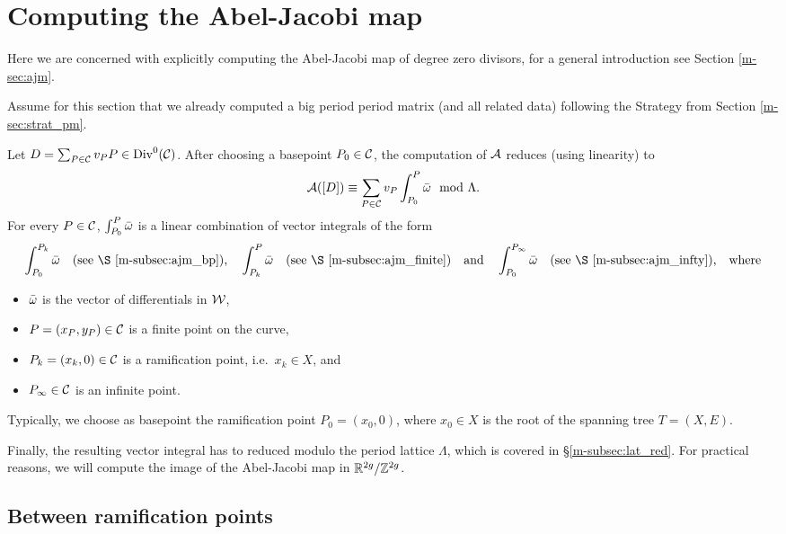 \documentclass[main.tex]{subfiles}
\begin{document}
  \section{Computing the Abel-Jacobi map}\label{sec:comp_ajm}
  
   Here we are concerned with explicitly computing the Abel-Jacobi map of degree zero divisors, for a general introduction see Section \ref{m-sec:ajm}.
   
   Assume for this section that we already computed a big period period matrix (and all related data) following the Strategy from Section \ref{m-sec:strat_pm}. 
   
   Let $D = \sum_{P \in \mathcal{C}} v_P P \in \operatorname{Div}^0(\mathcal{C})$. After choosing a basepoint $P_0 \in \mathcal{C}$, the computation of $\mathcal{A}$ reduces (using linearity) to
   \begin{equation}
     \mathcal{A}([D]) \equiv \sum_{P \in \mathcal{C}} v_P \int_{P_0}^P \bar{\omega} \mod \Lambda.
   \end{equation}
  For every $P \in \mathcal{C}$, $\int_{P_0}^P \bar{\omega}$ is a linear combination of vector integrals of the form
  \begin{align*}
    \int_{P_0}^{P_k} \bar\w\quad \text{(see \S \ref{m-subsec:ajm_bp}),} \quad
    \int_{P_k}^{P} \bar\w \quad \text{(see \S \ref{m-subsec:ajm_finite})}
    \quad \text{and} \quad \int_{P_0}^{P_{\infty}} \bar\w\quad \text{(see \S \ref{m-subsec:ajm_infty}),} \quad \text{where}
  \end{align*}
  \begin{itemize}
   \item $\bar{\omega}$ is the vector of differentials in $\mathcal{W}$,
   \item $P = (x_P,y_P) \in \mathcal{C}$ is a finite point on the curve,
   \item $P_k = (x_k,0) \in \mathcal{C}$ is a ramification point, i.e.\ $x_k \in X$, and
   \item $P_{\infty} \in \mathcal{C}$ is an infinite point.
  \end{itemize}
  
   Typically, we choose as basepoint the ramification point $P_0 = (x_0,0)$, where $x_0 \in X$ is the root of the spanning tree $T = (X,E)$.
   
  Finally, the resulting vector integral has to reduced modulo the period lattice $\Lambda$, which is covered in \S \ref{m-subsec:lat_red}. For practical reasons, we will compute the
  image of the Abel-Jacobi map in $\mathbb{R}^{2g} / \mathbb{Z}^{2g}$.
  
  
  \subsection{Between ramification points}\label{subsec:ajm_bp}
\end{document}

